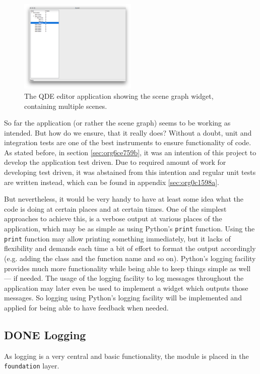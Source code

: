 \documentclass[10pt, openright, notitlepage]{scrreprt}
\begin{document}
\begin{figure}[H]
\centering
\includegraphics[width=0.5\textwidth]{./images/qde_alpha_05.png}
\caption{\label{fig:editor-alpha-04}
The QDE editor application showing the scene graph widget, containing multiple scenes.}
\end{figure}


So far the application (or rather the scene graph) seems to be working as
intended. But how do we ensure, that it really does? Without a doubt, unit and
integration tests are one of the best instruments to ensure functionality of
code. As stated before, in section \ref{sec:org6ce759b}, it was an intention of
this project to develop the application test driven. Due to required amount of
work for developing test driven, it was abstained from this intention and
regular unit tests are written instead, which can be found in appendix \ref{sec:org0c1598a}.

But nevertheless, it would be very handy to have at least some idea what the
code is doing at certain places and at certain times.
One of the simplest approaches to achieve this, is a verbose output at various
places of the application, which may be as simple as using Python's
\texttt{print} function. Using the \texttt{print} function may allow
printing something immediately, but it lacks of flexibility and demands each
time a bit of effort to format the output accordingly (e.g. adding the class and
the function name and so on). Python's logging facility provides much more
functionality while being able to keep things simple as well --- if needed.
The usage of the logging facility to log messages throughout the application may
later even be used to implement a widget which outputs those messages. So
logging using Python's logging facility will be implemented and applied for
being able to have feedback when needed.
\subsection{{\bfseries\sffamily DONE} Logging}
\label{sec:orgdb9442d}
As logging is a very central and basic functionality, the module is placed in
the \texttt{foundation} layer.
\end{document}
